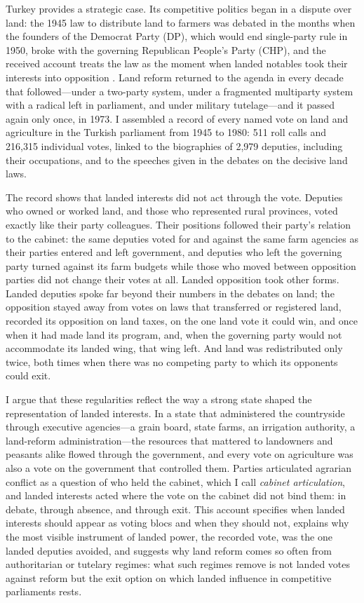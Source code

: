 \documentclass[12pt]{article}
\begin{document}
Turkey provides a strategic case. Its competitive politics began in a dispute over land: the 1945 law to distribute land to farmers was debated in the months when the founders of the Democrat Party (DP), which would end single-party rule in 1950, broke with the governing Republican People's Party (CHP), and the received account treats the law as the moment when landed notables took their interests into opposition \citep{karpat1959,keyderpamuk1984}. Land reform returned to the agenda in every decade that followed---under a two-party system, under a fragmented multiparty system with a radical left in parliament, and under military tutelage---and it passed again only once, in 1973. I assembled a record of every named vote on land and agriculture in the Turkish parliament from 1945 to 1980: 511 roll calls and 216,315 individual votes, linked to the biographies of 2,979 deputies, including their occupations, and to the speeches given in the debates on the decisive land laws.

The record shows that landed interests did not act through the vote. Deputies who owned or worked land, and those who represented rural provinces, voted exactly like their party colleagues. Their positions followed their party's relation to the cabinet: the same deputies voted for and against the same farm agencies as their parties entered and left government, and deputies who left the governing party turned against its farm budgets while those who moved between opposition parties did not change their votes at all. Landed opposition took other forms. Landed deputies spoke far beyond their numbers in the debates on land; the opposition stayed away from votes on laws that transferred or registered land, recorded its opposition on land taxes, on the one land vote it could win, and once when it had made land its program, and, when the governing party would not accommodate its landed wing, that wing left. And land was redistributed only twice, both times when there was no competing party to which its opponents could exit.

I argue that these regularities reflect the way a strong state shaped the representation of landed interests. In a state that administered the countryside through executive agencies---a grain board, state farms, an irrigation authority, a land-reform administration---the resources that mattered to landowners and peasants alike flowed through the government, and every vote on agriculture was also a vote on the government that controlled them. Parties articulated agrarian conflict as a question of who held the cabinet, which I call \emph{cabinet articulation}, and landed interests acted where the vote on the cabinet did not bind them: in debate, through absence, and through exit. This account specifies when landed interests should appear as voting blocs and when they should not, explains why the most visible instrument of landed power, the recorded vote, was the one landed deputies avoided, and suggests why land reform comes so often from authoritarian or tutelary regimes: what such regimes remove is not landed votes against reform but the exit option on which landed influence in competitive parliaments rests.
\end{document}
